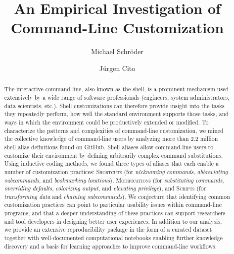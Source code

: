 \documentclass[smallextended,natbib]{svjour3}
\begin{document}
\title{An Empirical Investigation of Command-Line Customization}

\author{Michael Schröder \and Jürgen Cito}

\maketitle

\begin{abstract}
	The interactive command line, also known as the shell, is a prominent mechanism used extensively by a wide range of software professionals (engineers, system administrators, data scientists, etc.). Shell customizations can therefore provide insight into the tasks they repeatedly perform, how well the standard environment supports those tasks, and ways in which the environment could be productively extended or modified.
	To characterize the patterns and complexities of command-line customization, we mined the collective knowledge of command-line users by analyzing more than 2.2 million shell alias definitions found on GitHub.
	Shell aliases allow command-line users to customize their environment by defining arbitrarily complex command substitutions.
	Using inductive coding methods, we found three types of aliases that each enable a number of customization practices: 
	\textsc{Shortcuts} (for \emph{nicknaming commands}, \emph{abbreviating subcommands}, and \emph{bookmarking locations}),
	\textsc{Modifications} (for \emph{substituting commands}, \emph{overriding defaults}, \emph{colorizing output}, and \emph{elevating privilege}),
	and \textsc{Scripts} (for \emph{transforming data} and \emph{chaining subcommands}).
	We conjecture that identifying common customization practices can point to particular usability issues within command-line programs, and that a deeper understanding of these practices can support researchers and tool developers in designing better user experiences.
	In addition to our analysis, we provide an extensive reproducibility package in the form of a curated dataset together with well-documented computational notebooks enabling further knowledge discovery and a basis for learning approaches to improve command-line workflows.
\end{abstract}
\end{document}
